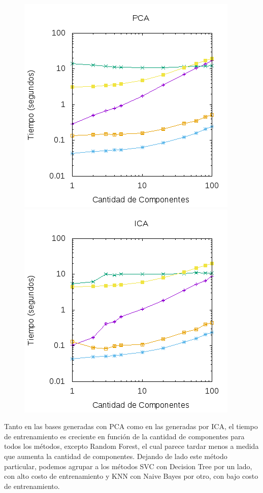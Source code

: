 \documentclass[10pt, a4paper]{article}
\begin{document}
\begin{figure}[H]
\centering
\includegraphics[scale=0.6]{../src/data/tmpca.png}
\includegraphics[scale=0.6]{../src/data/tmica.png}
\end{figure}

Tanto en las bases generadas con PCA como en las generadas por ICA, el tiempo de entrenamiento es creciente en función de la cantidad de componentes para todos los métodos, excepto Random Forest, el cual parece tardar menos a medida que aumenta la cantidad de componentes. Dejando de lado este método particular, podemos agrupar a los métodos SVC con Decision Tree por un lado, con alto costo de entrenamiento y KNN con Naive Bayes por otro, con bajo costo de entrenamiento.
\end{document}
